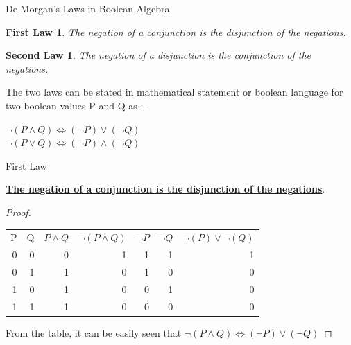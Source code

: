 \documentclass{beamer}
\begin{document}
   
\begin{frame}{De Morgan's Laws in Boolean Algebra}

\newtheorem{first}{First Law}
\begin{first}
The negation of a conjunction is the disjunction of the negations. \\
\end{first}

\newtheorem{second}{Second Law}
\begin{second}
The negation of a disjunction is the conjunction of the negations. \\ 
\end{second}

The two laws can be stated in mathematical statement or boolean language for two boolean values P and Q as :-

    $\neg(P\land Q)\iff(\neg P)\lor(\neg Q)$
    \\
    $\neg(P\lor Q)\iff(\neg P)\land(\neg Q)$

\end{frame}

\begin{frame}{First Law}

\textbf{\underline{The negation of a conjunction is the disjunction of the negations}}. \\
\begin{proof}
\begin{table}
\centering
\begin{tabular}{|r r r r r r r|}

P 	&Q 	&$P \land Q$ 	&$\neg(P \land Q)$ 	&$\neg P$ 	&$\neg Q$ 	&$\neg(P)\lor \neg(Q)$ \\
0 	&0 	&0 		&1 			&1 		&1 		&1 \\
0 	&1 	&1		&0 			&1 		&0 		&0 \\ 
1 	&0 	&1 		&0 			&0 		&1 		&0 \\
1 	&1 	&1 		&0 			&0 		&0 		&0

\end{tabular}
\end{table}
From the table, it can be easily seen that
    $\neg(P\land Q)\iff(\neg P)\lor(\neg Q)$

\end{proof}
\end{frame}
\end{document}
